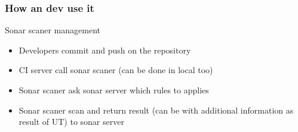 \subsubsection{How an dev use it}
\begin{frame}[fragile]{\subsubsecname}
  Sonar scaner management
  \begin{itemize}
    \item Developers commit and push on the repository
    \item CI server call sonar scaner (can be done in local too)
    \item Sonar scaner ask sonar server which rules to applies
    \item Sonar scaner scan and return result (can be with additional information as result of UT) to sonar server
  \end{itemize}
\end{frame}
